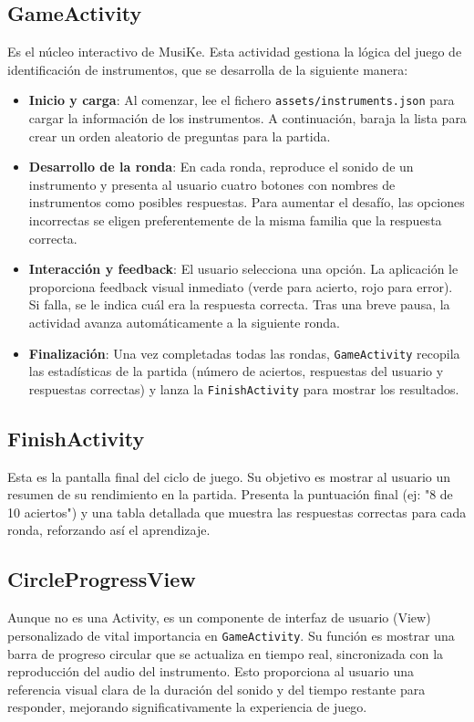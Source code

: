 \documentclass{article}
\newcommand{\iconpath}{/home/khz/git/tabler-icons/icons/outline-white/}
\newcommand{\icon}[1]{}
\begin{document}
\subsection{GameActivity \icon{device-gamepad-2}}
Es el núcleo interactivo de MusiKe. Esta actividad gestiona la lógica del juego de identificación de instrumentos, que se desarrolla de la siguiente manera:
\begin{itemize}
    \item \textbf{Inicio y carga}: Al comenzar, lee el fichero \texttt{assets/instruments.json} para cargar la información de los instrumentos. A continuación, baraja la lista para crear un orden aleatorio de preguntas para la partida.
    \item \textbf{Desarrollo de la ronda}: En cada ronda, reproduce el sonido de un instrumento y presenta al usuario cuatro botones con nombres de instrumentos como posibles respuestas. Para aumentar el desafío, las opciones incorrectas se eligen preferentemente de la misma familia que la respuesta correcta.
    \item \textbf{Interacción y feedback}: El usuario selecciona una opción. La aplicación le proporciona feedback visual inmediato (verde para acierto, rojo para error). Si falla, se le indica cuál era la respuesta correcta. Tras una breve pausa, la actividad avanza automáticamente a la siguiente ronda.
    \item \textbf{Finalización}: Una vez completadas todas las rondas, \texttt{GameActivity} recopila las estadísticas de la partida (número de aciertos, respuestas del usuario y respuestas correctas) y lanza la \texttt{FinishActivity} para mostrar los resultados.
\end{itemize}

\subsection{FinishActivity \icon{award}}
Esta es la pantalla final del ciclo de juego. Su objetivo es mostrar al usuario un resumen de su rendimiento en la partida. Presenta la puntuación final (ej: "8 de 10 aciertos") y una tabla detallada que muestra las respuestas correctas para cada ronda, reforzando así el aprendizaje.

\subsection{CircleProgressView \icon{chart-pie}}
Aunque no es una Activity, es un componente de interfaz de usuario (View) personalizado de vital importancia en \texttt{GameActivity}. Su función es mostrar una barra de progreso circular que se actualiza en tiempo real, sincronizada con la reproducción del audio del instrumento. Esto proporciona al usuario una referencia visual clara de la duración del sonido y del tiempo restante para responder, mejorando significativamente la experiencia de juego.
\end{document}
